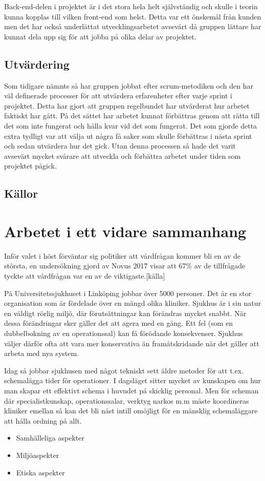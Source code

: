 Back-end-delen i projektet är i det stora hela helt självständig och skulle i teorin kunna kopplas till vilken front-end som helst. Detta var ett önskemål från kunden men det har också underlättat utvecklingsarbetet avsevärt då gruppen lättare har kunnat dela upp sig för att jobba på olika delar av projektet.

\subsection{Utvärdering}
Som tidigare nämnts så har gruppen jobbat efter scrum-metodiken och den har väl definerade processer för att utvärdera erfarenheter efter varje sprint i projektet. Detta har gjort att gruppen regelbundet har utvärderat hur arbetet faktiskt har gått. På det sättet har arbetet kunnat förbättras genom att rätta till det som inte fungerat och hålla kvar vid det som fungerat. Det som gjorde detta extra tydligt var att välja ut några få saker som skulle förbättras i nästa sprint och sedan utvärdera hur det gick. Utan denna processen så hade det varit avsevärt mycket svårare att utveckla och förbättra arbetet under tiden som projektet pågick.

\subsection{Källor}


\section{Arbetet i ett vidare sammanhang}
Inför valet i höst förväntar sig politiker att vårdfrågan kommer bli en av de största, en undersökning gjord av Novus 2017 visar att 67\% av de tillfrågade tyckte att vårdfrågan var en av de viktigaste.[källa]

På Universitetssjukhuset i Linköping jobbar över 5000 personer. Det är en stor organisation som är fördelade över en mängd olika kliniker. Sjukhus är i sin natur en väldigt rörlig miljö, där förutsättningar kan förändras mycket snabbt. När dessa förändringar sker gäller det att agera med en gång. Ett fel (som en dubbelbokning av en operationssal) kan få förödande konsekvenser. Sjukhus väljer därför ofta att vara mer konservativa än framåtskridande när det gäller att arbeta med nya system.

Idag så jobbar sjukhusen med något tekniskt sett äldre metoder för att t.ex. schemalägga tider för operationer. I dagsläget sitter mycket av kunskapen om hur man skapar ett effektivt schema i huvudet på skicklig personal. Men för scheman där specialistkunskap, operationssalar, verktyg narkos m.m måste koordineras kliniker emellan så kan det bli näst intill omöjligt för en mänsklig schemaläggare att hålla ordning på allt.

\begin{itemize}
\item Samhälleliga aspekter
\item Miljöaspekter
\item Etiska aspekter
\end{itemize}